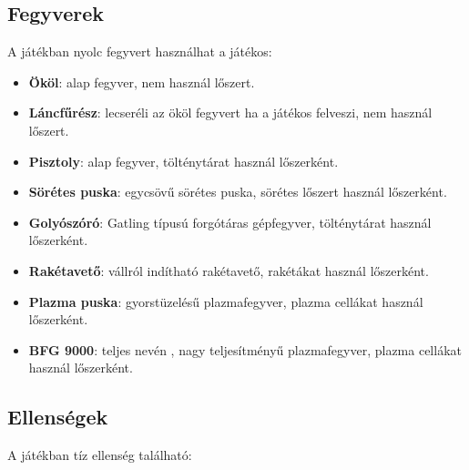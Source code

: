 \documentclass{thesis-ekf}
\theoremstyle{definition}
\begin{document}
\subsection{Fegyverek}

A játékban nyolc fegyvert használhat a játékos:

\begin{itemize}
    \item \textbf{Ököl}: alap fegyver, nem használ lőszert.
    \item \textbf{Láncfűrész}: lecseréli az ököl fegyvert ha a játékos felveszi,
        nem használ lőszert.
    \item \textbf{Pisztoly}: alap fegyver, tölténytárat használ lőszerként.
    \item \textbf{Sörétes puska}: egycsövű sörétes puska, sörétes lőszert
        használ lőszerként.
    \item \textbf{Golyószóró}: Gatling típusú forgótáras gépfegyver,
        tölténytárat használ lőszerként.
    \item \textbf{Rakétavető}: vállról indítható rakétavető, rakétákat használ
        lőszerként.
    \item \textbf{Plazma puska}: gyorstüzelésű plazmafegyver, plazma cellákat
        használ lőszerként.
    \item \textbf{BFG 9000}: teljes nevén , nagy
        teljesítményű plazmafegyver, plazma cellákat használ lőszerként.
\end{itemize}
\cite[Fegyverek]{doomgame}

\subsection{Ellenségek}

A játékban tíz ellenség található:
\end{document}
